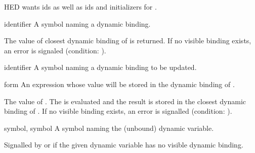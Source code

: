 \label{control-1}
%
\begin{optPrivate}
    HED wants ids as well as ids and initializers for .
\end{optPrivate}
%
\begin{optDefinition}
%
%
\Syntax
{}%
%
\begin{arguments}
    \item[identifier] A symbol naming a dynamic binding.
\end{arguments}
%
\result%
The value of closest dynamic binding of  is returned.  If no
visible binding exists, an error is signaled (condition:
).

%
\Syntax
{}%
%
\begin{arguments}
    \item[identifier] A symbol naming a dynamic binding to be updated.

    \item[form] An expression whose value will be stored in the dynamic binding
    of .
\end{arguments}
%
\result%
The value of .
%
\remarks%
The  is evaluated and the result is stored in the closest dynamic
binding of .  If no visible binding exists, an error is
signalled (condition: 
).

%
\begin{initoptions}
    \item[symbol, symbol] A symbol naming the (unbound) dynamic variable.
\end{initoptions}
%
\remarks%
Signalled by  or  if the given
dynamic variable has no visible dynamic binding.


\end{optDefinition}
